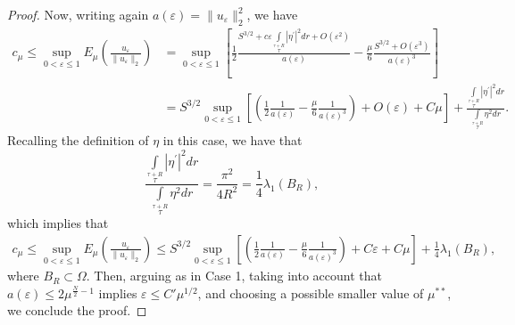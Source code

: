 \documentclass[10pt]{article}
\newcommand{\eps}{\varepsilon}
\theoremstyle{definition}
\numberwithin{equation}{section}
\begin{document}
\begin{proof}
Now, writing again $a(\varepsilon)=\|u_{\varepsilon}\|_{2}^{2}$, we have
\begin{equation*}
    \begin{aligned}\displaystyle
    c_{\mu}\leq \sup\limits_{0<\varepsilon\le 1}E_{\mu}\left(\frac{u_{\varepsilon}}{\|u_{\varepsilon}\|_{2}}\right)&=\sup\limits_{0<\varepsilon\le 1}\left[\frac{1}{2}\frac{S^{3/2}+c \varepsilon \int\limits_{\tau}\limits^{\tau+R}|\eta^{\prime}|^{2}dr +O(\varepsilon^{2})}{a(\varepsilon)}-\frac{\mu}{6}\frac{S^{3/2}+O(\varepsilon^{3})}{a(\varepsilon)^{3}}\right]\\
    &=S^{3/2}\sup\limits_{0<\varepsilon\le1}\left[\left(\frac{1}{2}\frac{1}{a(\varepsilon)}-\frac{\mu}{6}\frac{1}{a(\varepsilon)^{3}}\right)
    +O(\varepsilon)+C\mu\right]+\frac{\int\limits_{\tau}\limits^{\tau+R}|\eta^{\prime}|^{2}dr}{\int\limits_{\tau}\limits^{\tau+R}\eta^{2}dr}.
    \end{aligned}
\end{equation*}
Recalling the definition of $\eta$ in this case, we have that
\[
\frac{\int\limits_{\tau}\limits^{\tau+R}|\eta^{\prime}|^{2}dr}{\int\limits_{\tau}\limits^{\tau+R}\eta^{2}dr}=
\frac{\pi^2}{4R^2}
=\frac{1}{4}\lambda_{1}(B_{R}),\]
which implies that
\begin{equation*}
    \begin{aligned}\displaystyle
 c_{\mu}\leq \sup\limits_{0<\varepsilon\le 1}E_{\mu}\left(\frac{u_{\varepsilon}}{\|u_{\varepsilon}\|_{2}}\right)\leq S^{3/2}\sup\limits_{0<\varepsilon\le 1}\left[\left(\frac{1}{2}\frac{1}{a(\varepsilon)}-\frac{\mu}{6}\frac{1}{a(\varepsilon)^{3}}\right)
    +C\varepsilon+C\mu\right]+\frac{1}{4}\lambda_{1}(B_{R}),
    \end{aligned}
\end{equation*}
where $B_{R}\subset \Omega$. Then, arguing as in Case 1, taking into account that $a(\eps)\le 2\mu^{\frac{N}{2}-1}$ implies $\eps \le C' \mu^{1/2}$, and choosing a possible smaller value of
$\mu^{**}$, we conclude the proof.
\end{proof}
\end{document}
